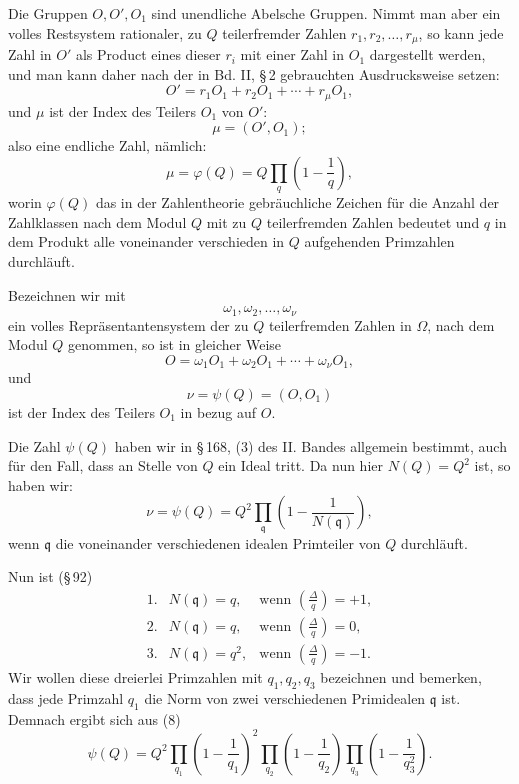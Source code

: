 \documentclass[11pt]{article}
\newcommand{\Jac}[2]{\left(\frac{#1}{#2}\right)}
\begin{document}
Die Gruppen $O,O',O_1$ sind unendliche Abelsche Gruppen. Nimmt man aber ein volles Restsystem rationaler, zu $Q$ teilerfremder Zahlen $r_1,r_2,\ldots,r_\mu$, so kann jede Zahl in $O'$ als Product eines dieser $r_i$ mit einer Zahl in $O_1$ dargestellt werden, und man kann daher nach der in Bd. II, \S\,2 gebrauchten Ausdrucksweise setzen:
\begin{equation}
 O'=r_1O_1+r_2O_1+\cdots+r_\mu O_1,
\tag{3}
\end{equation}
und $\mu$ ist der Index des Teilers $O_1$ von $O'$:
\begin{equation}
 \mu=(O',O_1);
\tag{4}
\end{equation}
also eine endliche Zahl, nämlich:
\begin{equation}
 \mu=\varphi(Q)=Q\prod_q\left(1-\frac1q\right),
\tag{5}
\end{equation}
worin $\varphi(Q)$ das in der Zahlentheorie gebräuchliche Zeichen für die Anzahl der Zahlklassen nach dem Modul $Q$ mit zu $Q$ teilerfremden Zahlen bedeutet und $q$ in dem Produkt alle voneinander verschieden in $Q$ aufgehenden Primzahlen durchläuft.

Bezeichnen wir mit
\[
 \omega_1,\omega_2,\ldots,\omega_\nu
\]
ein volles Repräsentantensystem der zu $Q$ teilerfremden Zahlen in $\Omega$, nach dem Modul $Q$ genommen, so ist in gleicher Weise
\begin{equation}
 O=\omega_1O_1+\omega_2O_1+\cdots+\omega_\nu O_1,
\tag{6}
\end{equation}
und
\begin{equation}
 \nu=\psi(Q)=(O,O_1)
\tag{7}
\end{equation}
ist der Index des Teilers $O_1$ in bezug auf $O$.

Die Zahl $\psi(Q)$ haben wir in \S\,168, (3) des II. Bandes allgemein bestimmt, auch für den Fall, dass an Stelle von $Q$ ein Ideal tritt. Da nun hier $N(Q)=Q^2$ ist, so haben wir:
\begin{equation}
 \nu=\psi(Q)=Q^2\prod_{\mathfrak q}\left(1-\frac1{N(\mathfrak q)}\right),
\tag{8}
\end{equation}
wenn $\mathfrak q$ die voneinander verschiedenen idealen Primteiler von $Q$ durchläuft.

Nun ist (\S\,92)
\[
\begin{array}{lll}
1.& N(\mathfrak q)=q,   & \text{wenn } \Jac{\Delta}{q}=+1,\\
2.& N(\mathfrak q)=q,   & \text{wenn } \Jac{\Delta}{q}=0,\\
3.& N(\mathfrak q)=q^2, & \text{wenn } \Jac{\Delta}{q}=-1.
\end{array}
\]
Wir wollen diese dreierlei Primzahlen mit $q_1,q_2,q_3$ bezeichnen und bemerken, dass jede Primzahl $q_1$ die Norm von zwei verschiedenen Primidealen $\mathfrak q$ ist. Demnach ergibt sich aus (8)
\begin{equation}
 \psi(Q)
 =Q^2
  \prod_{q_1}\left(1-\frac1{q_1}\right)^2
  \prod_{q_2}\left(1-\frac1{q_2}\right)
  \prod_{q_3}\left(1-\frac1{q_3^2}\right).
\tag{9}
\end{equation}
\end{document}
